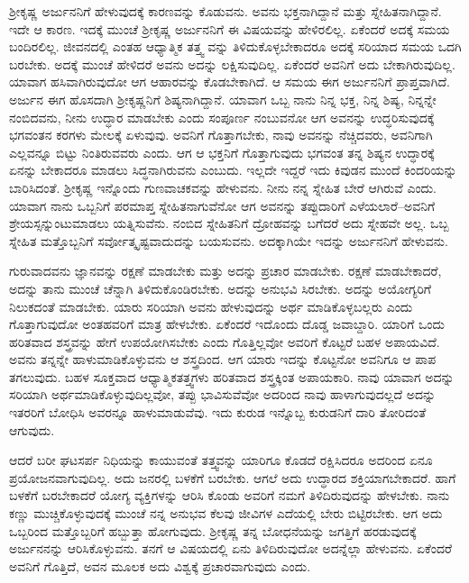 ಶ್ರೀಕೃಷ್ಣ ಅರ್ಜುನನಿಗೆ ಹೇಳುವುದಕ್ಕೆ ಕಾರಣವನ್ನು ಕೊಡುವನು. ಅವನು ಭಕ್ತನಾಗಿದ್ದಾನೆ ಮತ್ತು ಸ್ನೇಹಿತನಾಗಿದ್ದಾನೆ. ಇದೇ ಆ ಕಾರಣ. ಇದಕ್ಕೆ ಮುಂಚೆ ಶ್ರೀಕೃಷ್ಣ ಅರ್ಜುನನಿಗೆ ಈ ವಿಷಯವನ್ನು ಹೇಳಿರಲಿಲ್ಲ. ಏಕೆಂದರೆ ಅದಕ್ಕೆ ಸಮಯ ಬಂದಿರಲಿಲ್ಲ. ಜೀವನದಲ್ಲಿ ಎಂತಹ ಆಧ್ಯಾತ್ಮಿಕ ತತ್ತ್ವ ವನ್ನು ತಿಳಿದುಕೊಳ್ಳಬೇಕಾದರೂ ಅದಕ್ಕೆ ಸರಿಯಾದ ಸಮಯ ಒದಗಿ ಬರಬೇಕು. ಅದಕ್ಕೆ ಮುಂಚೆ ಹೇಳಿದರೆ ಅವನು ಅದನ್ನು ಲಕ್ಷಿಸುವುದಿಲ್ಲ. ಏಕೆಂದರೆ ಅವನಿಗೆ ಅದು ಬೇಕಾಗಿರುವುದಿಲ್ಲ. ಯಾವಾಗ ಹಸಿವಾಗಿರುವುದೋ ಆಗ ಆಹಾರವನ್ನು ಕೊಡಬೇಕಾಗಿದೆ. ಆ ಸಮಯ ಈಗ ಅರ್ಜುನನಿಗೆ ಪ್ರಾಪ್ತವಾಗಿದೆ. ಅರ್ಜುನ ಈಗ ಹೊಸದಾಗಿ ಶ್ರೀಕೃಷ್ಣನಿಗೆ ಶಿಷ್ಯನಾಗಿದ್ದಾನೆ. ಯಾವಾಗ ಒಬ್ಬ ನಾನು ನಿನ್ನ ಭಕ್ತ, ನಿನ್ನ ಶಿಷ್ಯ, ನಿನ್ನನ್ನೇ ನಂಬಿದವನು, ನೀನು ಉದ್ಧಾರ ಮಾಡಬೇಕು ಎಂದು ಸಂಪೂರ್ಣ ನಂಬುವನೋ ಆಗ ಅವನನ್ನು ಉದ್ಧರಿಸುವುದಕ್ಕೆ ಭಗವಂತನ ಕರಗಳು ಮೇಲಕ್ಕೆ ಏಳುವುವು. ಅವನಿಗೆ ಗೊತ್ತಾಗಬೇಕು, ನಾವು ಅವನನ್ನು ನೆಚ್ಚಿದವರು, ಅವನಿಗಾಗಿ ಎಲ್ಲವನ್ನೂ ಬಿಟ್ಟು ನಿಂತಿರುವವರು ಎಂದು. ಆಗ ಆ ಭಕ್ತನಿಗೆ ಗೊತ್ತಾಗುವುದು ಭಗವಂತ ತನ್ನ ಶಿಷ್ಯನ ಉದ್ಧಾರಕ್ಕೆ ಏನನ್ನು ಬೇಕಾದರೂ ಮಾಡಲು ಸಿದ್ಧನಾಗಿರುವನು ಎಂಬುದು. ಇಲ್ಲದೇ ಇದ್ದರೆ ಇದು ಕಿವುಡನ ಮುಂದೆ ಕಿಂದರಿಯನ್ನು ಬಾರಿಸಿದಂತೆ. ಶ್ರೀಕೃಷ್ಣ ಇನ್ನೊಂದು ಗುಣವಾಚಕವನ್ನು ಹೇಳುವನು. ನೀನು ನನ್ನ ಸ್ನೇಹಿತ ಬೇರೆ ಆಗಿರುವೆ ಎಂದು. ಯಾವಾಗ ನಾನು ಒಬ್ಬನಿಗೆ ಪರಮಾಪ್ತ ಸ್ನೇಹಿತನಾಗುವೆನೋ ಆಗ ಅವನನ್ನು ತಪ್ಪುದಾರಿಗೆ ಎಳೆಯಲಾರೆ–ಅವನಿಗೆ ಶ್ರೇಯಸ್ಸನ್ನುಂಟುಮಾಡಲು ಯತ್ನಿಸುವೆನು. ನಂಬಿದ ಸ್ನೇಹಿತನಿಗೆ ದ್ರೋಹವನ್ನು ಬಗೆದರೆ ಅದು ಸ್ನೇಹವೇ ಅಲ್ಲ. ಒಬ್ಬ ಸ್ನೇಹಿತ ಮತ್ತೊಬ್ಬನಿಗೆ ಸರ್ವೋತ್ಕೃಷ್ಟವಾದುದನ್ನು ಬಯಸುವನು. ಅದಕ್ಕಾಗಿಯೇ ಇದನ್ನು ಅರ್ಜುನನಿಗೆ ಹೇಳುವನು.

ಗುರುವಾದವನು ಜ್ಞಾನವನ್ನು ರಕ್ಷಣೆ ಮಾಡಬೇಕು ಮತ್ತು ಅದನ್ನು ಪ್ರಚಾರ ಮಾಡಬೇಕು. ರಕ್ಷಣೆ ಮಾಡಬೇಕಾದರೆ, ಅದನ್ನು ತಾನು ಮುಂಚೆ ಚೆನ್ನಾಗಿ ತಿಳಿದುಕೊಂಡಿರಬೇಕು. ಅದನ್ನು ಅನುಭವಿ ಸಿರಬೇಕು. ಅದನ್ನು ಅಯೋಗ್ಯರಿಗೆ ನಿಲುಕದಂತೆ ಮಾಡಬೇಕು. ಯಾರು ಸರಿಯಾಗಿ ಅವನು ಹೇಳುವುದನ್ನು ಅರ್ಥ ಮಾಡಿಕೊಳ್ಳಬಲ್ಲರು ಎಂದು ಗೊತ್ತಾಗುವುದೋ ಅಂತಹವರಿಗೆ ಮಾತ್ರ ಹೇಳಬೇಕು. ಏಕೆಂದರೆ ಇದೊಂದು ದೊಡ್ಡ ಜವಾಬ್ದಾರಿ. ಯಾರಿಗೆ ಒಂದು ಹರಿತವಾದ ಶಸ್ತ್ರವನ್ನು ಹೇಗೆ ಉಪಯೋಗಿಸಬೇಕು ಎಂದು ಗೊತ್ತಿಲ್ಲವೋ ಅವರಿಗೆ ಕೊಟ್ಟರೆ ಬಹಳ ಅಪಾಯವಿದೆ. ಅವನು ತನ್ನನ್ನೇ ಹಾಳುಮಾಡಿಕೊಳ್ಳುವನು ಆ ಶಸ್ತ್ರದಿಂದ. ಆಗ ಯಾರು ಇದನ್ನು ಕೊಟ್ಟನೋ ಅವನಿಗೂ ಆ ಪಾಪ ತಗಲುವುದು. ಬಹಳ ಸೂಕ್ತವಾದ ಆಧ್ಯಾತ್ಮಿಕತತ್ತ್ವಗಳು ಹರಿತವಾದ ಶಸ್ತ್ರಕ್ಕಿಂತ ಅಪಾಯಕಾರಿ. ನಾವು ಯಾವಾಗ ಅದನ್ನು ಸರಿಯಾಗಿ ಅರ್ಥಮಾಡಿಕೊಳ್ಳುವುದಿಲ್ಲವೋ, ತಪ್ಪು ಭಾವಿಸುವೆವೋ ಅದರಿಂದ ನಾವು ಹಾಳಾಗುವುದಲ್ಲದೆ ಅದನ್ನು ಇತರರಿಗೆ ಬೋಧಿಸಿ ಅವರನ್ನೂ ಹಾಳುಮಾಡುವೆವು. ಇದು ಕುರುಡ ಇನ್ನೊಬ್ಬ ಕುರುಡನಿಗೆ ದಾರಿ ತೋರಿದಂತೆ ಆಗುವುದು.

ಆದರೆ ಬರೀ ಘಟಸರ್ಪ ನಿಧಿಯನ್ನು ಕಾಯುವಂತೆ ತತ್ತ್ವವನ್ನು ಯಾರಿಗೂ ಕೊಡದೆ ರಕ್ಷಿಸಿದರೂ ಅದರಿಂದ ಏನೂ ಪ್ರಯೋಜನವಾಗುವುದಿಲ್ಲ. ಅದು ಜನರಲ್ಲಿ ಬಳಕೆಗೆ ಬರಬೇಕು. ಆಗಲೆ ಅದು ಉದ್ಧಾರದ ಶಕ್ತಿಯಾಗಬೇಕಾದರೆ. ಹಾಗೆ ಬಳಕೆಗೆ ಬರಬೇಕಾದರೆ ಯೋಗ್ಯ ವ್ಯಕ್ತಿಗಳನ್ನು ಆರಿಸಿ ಕೊಂಡು ಅವರಿಗೆ ನಮಗೆ ತಿಳಿದಿರುವುದನ್ನು ಹೇಳಬೇಕು. ನಾನು ಕಣ್ಣು ಮುಚ್ಚಿಕೊಳ್ಳುವುದಕ್ಕೆ ಮುಂಚೆ ನನ್ನ ಅನುಭವ ಕೆಲವು ಜೀವಿಗಳ ಎದೆಯಲ್ಲಿ ಬೇರು ಬಿಟ್ಟಿರಬೇಕು. ಆಗ ಅದು ಒಬ್ಬರಿಂದ ಮತ್ತೊಬ್ಬರಿಗೆ ಹಬ್ಬುತ್ತಾ ಹೋಗುವುದು. ಶ್ರೀಕೃಷ್ಣ ತನ್ನ ಬೋಧನೆಯನ್ನು ಜಗತ್ತಿಗೆ ಹರಡುವುದಕ್ಕೆ ಅರ್ಜುನನನ್ನು ಆರಿಸಿಕೊಳ್ಳುವನು. ತನಗೆ ಆ ವಿಷಯದಲ್ಲಿ ಏನು ತಿಳಿದಿರುವುದೋ ಅದನ್ನೆಲ್ಲಾ ಹೇಳುವನು. ಏಕೆಂದರೆ ಅವನಿಗೆ ಗೊತ್ತಿದೆ, ಅವನ ಮೂಲಕ ಅದು ವಿಶ್ವಕ್ಕೆ ಪ್ರಚಾರವಾಗುವುದು ಎಂದು.

